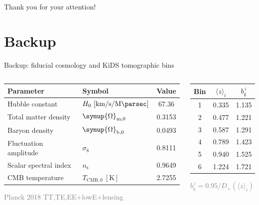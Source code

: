 \documentclass[aspectratio=1610, 10pt]{beamer}
\newcommand{\source}[1]{{\par\hfill\tiny\textcolor{gray}{#1}\par}}
\begin{document}
\begin{frame}[plain]
  \centering
  \vfill
  {Thank you for your attention!}
  \vfill
\end{frame}

\appendix
\section{Backup}

\begin{frame}{Backup: fiducial cosmology and KiDS tomographic bins}
  \begin{columns}[t]
    \begin{column}{0.48\textwidth}
      \centering
      \small
      \begin{tabular}{l l S[table-format=2.4]}
        \toprule
        Parameter & Symbol & {Value} \\
        \midrule
        Hubble constant & $H_0\ [\si{\kilo\metre\per\second\per\mega\parsec}]$ & 67.36 \\
        Total matter density & $\symup{\Omega}_{\mathrm{m},0}$ & 0.3153 \\
        Baryon density & $\symup{\Omega}_{\mathrm{b},0}$ & 0.0493 \\
        Fluctuation amplitude & $\sigma_8$ & 0.8111 \\
        Scalar spectral index & $n_{\mathrm{s}}$ & 0.9649 \\
        CMB temperature & $T_{\mathrm{CMB},0}\ [\si{\kelvin}]$ & 2.7255 \\
        \bottomrule
      \end{tabular}
      \source{Planck 2018 TT,TE,EE+lowE+lensing}
    \end{column}
    \begin{column}{0.40\textwidth}
      \centering
      \small
      \begin{tabular}{S[table-format=1] S[table-format=1.3] S[table-format=1.3]}
        \toprule
        {Bin} & {$\langle z \rangle_i$} & {$b_{\mathrm{g}}^{\,i}$} \\
         & 0.335 & 1.135 \\
        2 & 0.477 & 1.221 \\
        3 & 0.587 & 1.291 \\
        4 & 0.789 & 1.423 \\
        5 & 0.940 & 1.525 \\
        6 & 1.224 & 1.721 \\
        \bottomrule
      \end{tabular}
      \source{$b_{\mathrm{g}}^{\,i} = 0.95 / D_+(\langle z \rangle_i)$}
    \end{column}
  \end{columns}
\end{frame}
\end{document}
